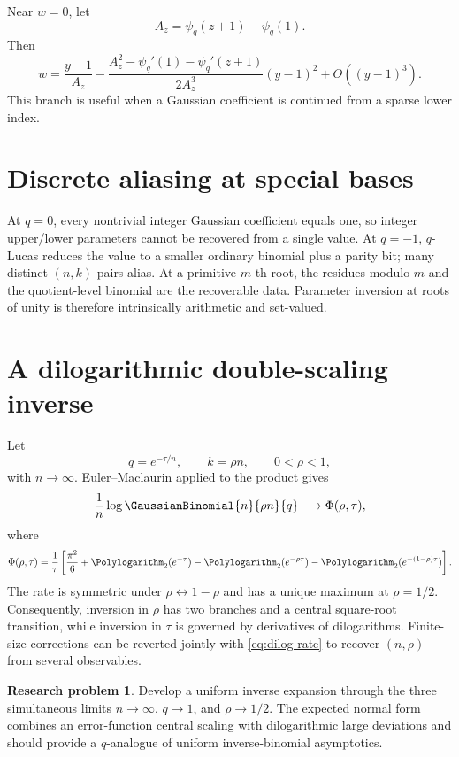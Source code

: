 \documentclass[11pt,letterpaper,oneside,openany]{book}
\theoremstyle{definition}
\newtheorem{researchproblem}[theorem]{Research problem}
\theoremstyle{remark}
\begin{document}
Near \(w=0\), let
\[
 A_z=\psi_q(z+1)-\psi_q(1).
\]
Then
\[
 w=\frac{y-1}{A_z}
 -\frac{A_z^2-\psi_q'(1)-\psi_q'(z+1)}{2A_z^3}(y-1)^2
 +O((y-1)^3).
\]
This branch is useful when a Gaussian coefficient is continued from a sparse
lower index.

\section{Discrete aliasing at special bases}
At \(q=0\), every nontrivial integer Gaussian coefficient equals one, so
integer upper/lower parameters cannot be recovered from a single value.  At
\(q=-1\), \(q\)-Lucas reduces the value to a smaller ordinary binomial plus a
parity bit; many distinct \((n,k)\) pairs alias.  At a primitive \(m\)-th root,
the residues modulo \(m\) and the quotient-level binomial are the recoverable
data.  Parameter inversion at roots of unity is therefore intrinsically
arithmetic and set-valued.

\section{A dilogarithmic double-scaling inverse}
Let
\[
 q=e^{-\tau/n},
 \qquad k=\rho n,
 \qquad 0<\rho<1,
\]
with \(n\to\infty\).  Euler--Maclaurin applied to the product gives
\begin{equation}\label{eq:gaussian-double-scaling}
 \frac1n\log\GaussianBinomial{n}{\rho n}{q}
 \longrightarrow
 \Phi(\rho,\tau),
\end{equation}
where
\begin{equation}\label{eq:dilog-rate}
 \Phi(\rho,\tau)=\frac1\tau\left[
 \frac{\pi^2}{6}+\Polylogarithm_2(e^{-\tau})
 -\Polylogarithm_2(e^{-\rho\tau})
 -\Polylogarithm_2(e^{-(1-\rho)\tau})
 \right].
\end{equation}
The rate is symmetric under \(\rho\leftrightarrow1-\rho\) and has a unique
maximum at \(\rho=1/2\).  Consequently, inversion in \(\rho\) has two branches
and a central square-root transition, while inversion in \(\tau\) is governed
by derivatives of dilogarithms.  Finite-size corrections can be reverted
jointly with \eqref{eq:dilog-rate} to recover \((n,\rho)\) from several
observables.

\begin{researchproblem}
Develop a uniform inverse expansion through the three simultaneous limits
\(n\to\infty\), \(q\to1\), and \(\rho\to1/2\).  The expected normal form
combines an error-function central scaling with dilogarithmic large deviations
and should provide a \(q\)-analogue of uniform inverse-binomial asymptotics.
\end{researchproblem}
\end{document}
